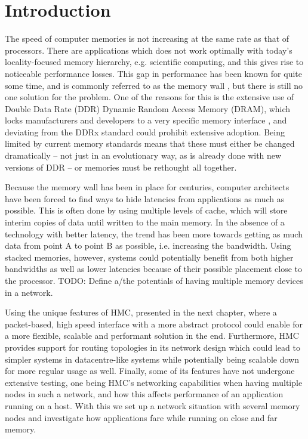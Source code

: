 \chapter{Introduction} \label{intro}
The speed of computer memories is not increasing at the same rate as that of processors. There are applications which does not work optimally with today's locality-focused memory hierarchy, e.g. scientific computing, and this gives rise to noticeable performance losses. This gap in performance has been known for quite some time, and is commonly referred to as the memory wall \cite{wulf1995hitting}, but there is still no one solution for the problem. One of the reasons for this is the extensive use of Double Data Rate (DDR) Dynamic Random Access Memory (DRAM), which locks manufacturers and developers to a very specific memory interface \cite{standard2008double}, and deviating from the DDRx standard could prohibit extensive adoption. Being limited by current memory standards means that these must either be changed dramatically -- not just in an evolutionary way, as is already done with new versions of DDR -- or memories must be rethought all together.
\bigskip

Because the memory wall has been in place for centuries, computer architects have been forced to find ways to hide latencies from applications as much as possible. This is often done by using multiple levels of cache, which will store interim copies of data until written to the main memory. In the absence of a technology with better latency, the trend has been more towards getting as much data from point A to point B as possible, i.e. increasing the bandwidth. Using stacked memories, however, systems could potentially benefit from both higher bandwidths as well as lower latencies because of their possible placement close to the processor. TODO: Define a/the potentials of having multiple memory devices in a network. 
\bigskip

Using the unique features of HMC, presented in the next chapter, where a packet-based, high speed interface with a more abstract protocol could enable for a more flexible, scalable and performant solution in the end. Furthermore, HMC provides support for routing topologies in its network design which could lead to simpler systems in datacentre-like systems while potentially being scalable down for more regular usage as well. Finally, some of its features have not undergone extensive testing, one being HMC's networking capabilities when having multiple nodes in such a network, and how this affects performance of an application running on a host. With this we set up a network situation with several memory nodes and investigate how applications fare while running on close and far memory.

